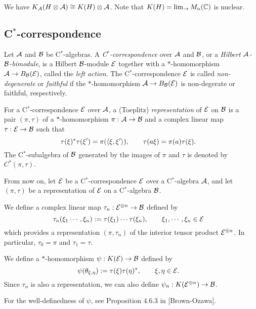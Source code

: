 \documentclass{../../../small}
\begin{document}
We have $K_{\mathcal{A}}(H\otimes\mathcal{A})\cong K(H)\otimes\mathcal{A}$. Note that $K(H)=\lim_\to M_n(\mathbb{C})$ is nuclear.





\subsection{C$^*$-correspondence}



\begin{defn}[C$^*$-correspondences]
Let $\mathcal{A}$ and $\mathcal{B}$ be C$^*$-algebras.
A \emph{C$^*$-correspondence} over $\mathcal{A}$ and $\mathcal{B}$, or a \emph{Hilbert $\mathcal{A}$-$\mathcal{B}$-bimodule}, is a Hilbert $\mathcal{B}$-module $\mathcal{E}$ together with a $*$-homomorphism $\mathcal{A}\to B_{\mathcal{B}}(\mathcal{E})$, called the \emph{left action}.
The C$^*$-correspondence $\mathcal{E}$ is called \emph{non-degenerate} or \emph{faithful} if the $*$-homomorphism $\mathcal{A}\to B_{\mathcal{B}}(\mathcal{E})$ is non-degerate or faithful, respectively.
\end{defn}


\begin{defn}
For a C$^*$-correspondence $\mathcal{E}$ over $\mathcal{A}$, a (Toeplitz) \emph{representation} of $\mathcal{E}$ on $\mathcal{B}$ is a pair $(\pi,\tau)$ of a $*$-homomorphism $\pi:\mathcal{A}\to\mathcal{B}$ and a complex linear map $\tau:\mathcal{E}\to\mathcal{B}$ such that
\[\tau(\xi)^*\tau(\xi')=\pi(\langle\xi,\xi'\rangle),\qquad\tau(a\xi)=\pi(a)\tau(\xi).\]
The C$^*$-subalgebra of $\mathcal{B}$ generated by the images of $\pi$ and $\tau$ is denoted by $C^*(\pi,\tau)$.
\end{defn}

From now on, let $\mathcal{E}$ be a C$^*$-correspondence $\mathcal{E}$ over a C$^*$-algebra $\mathcal{A}$, and let $(\pi,\tau)$ be a representation of $\mathcal{E}$ on a C$^*$-algebra $\mathcal{B}$.

\begin{defn}
We define a complex linear map $\tau_n:\mathcal{E}^{\otimes n}\to\mathcal{B}$ defined by
\[\tau_n(\xi_1\cdots,\xi_n):=\tau(\xi_1)\cdots\tau(\xi_n),\qquad\xi_1,\cdots,\xi_n\in\mathcal{E}\]
which provides a representation $(\pi,\tau_n)$ of the interior tensor product $\mathcal{E}^{\otimes n}$.
In particular, $\tau_0=\pi$ and $\tau_1=\tau$.
\end{defn}

\begin{defn}
We define a $*$-homomorphism $\psi:K(\mathcal{E})\to\mathcal{B}$ defined by
\[\psi(\theta_{\xi,\eta}):=\tau(\xi)\tau(\eta)^*,\qquad\xi,\eta\in\mathcal{E}.\]
Since $\tau_n$ is also a representation, we can also define $\psi_n:K(\mathcal{E}^{\otimes n})\to\mathcal{B}$.
\end{defn}
\begin{rmk}
For the well-definedness of $\psi$, see Proposition 4.6.3 in [Brown-Ozawa].
\end{rmk}
\end{document}
